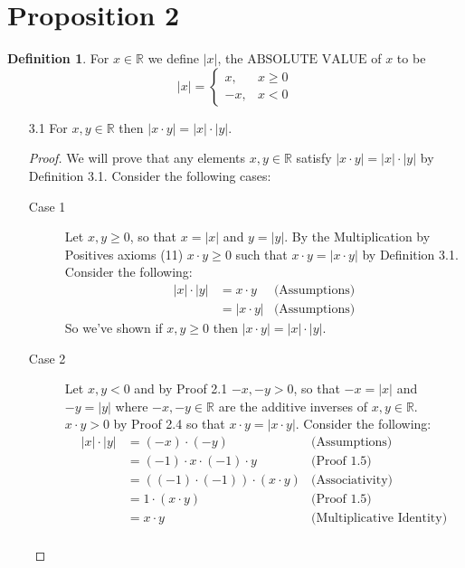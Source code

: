 \documentclass[12pt, letterpaper]{article}
\theoremstyle{plain}
\theoremstyle{definition}
\newtheorem{definition}[theorem]{Definition}
\theoremstyle{remark}
\begin{document}
\section{Proposition 2} %
\begin{definition}
    For $x\in\mathbb{R}$ we define $|x|$, the $\text{ABSOLUTE VALUE}$ of $x$ to be
    $$|x|=\begin{cases}
        x,  &x\ge 0\\
        -x, &x<0
    \end{cases}$$
\end{definition}
\begin{itemize}
    
\item[3.1] For $x,y\in\mathbb{R}$ then $|x\cdot y|=|x|\cdot |y|$.
\begin{proof}
We will prove that any elements $x,y\in\mathbb{R}$ satisfy $|x\cdot y|=|x|\cdot |y|$ by Definition 3.1. Consider the following cases:
\begin{description}
    \item[Case 1] Let $x,y\ge 0$, so that $x=|x|$ and $y=|y|$. By the Multiplication by Positives axioms (11) $x\cdot y\ge0$ such that $x\cdot y=|x\cdot y|$ by Definition 3.1. Consider the following:
    \begin{align*}
        |x|\cdot|y| &= x\cdot y   &\text{(Assumptions)}\\
                    &= |x\cdot y| &\text{(Assumptions)}
    \end{align*}
    So we've shown if $x,y\ge 0$ then $|x\cdot y|=|x|\cdot |y|$.
    \item[Case 2] Let $x,y<0$ and by Proof 2.1 $-x,-y>0$, so that $-x=|x|$ and $-y=|y|$ where $-x,-y\in\mathbb{R}$ are the additive inverses of $x,y\in\mathbb{R}$. $x\cdot y>0$ by Proof 2.4 so that $x\cdot y=|x\cdot y|$. Consider the following:
    \begin{align*}
        |x|\cdot|y| &= (-x)\cdot (-y)                   &\text{(Assumptions)} \\
                    &= (-1)\cdot x\cdot (-1)\cdot y     &\text{(Proof 1.5)} \\
                    &= ((-1)\cdot (-1))\cdot(x\cdot y)  &\text{(Associativity)} \\
                    &= 1\cdot (x\cdot y)                &\text{(Proof 1.5)} \\
                    &= x\cdot y                         &\text{(Multiplicative Identity)} \\

\end{align*}
\end{description}
\end{proof}
\end{itemize}
\end{document}
